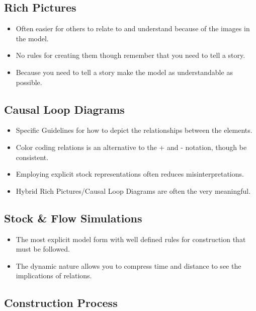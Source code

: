 \documentclass[]{memoir}
\begin{document}
\subsection{Rich Pictures}

\begin{itemize}
\itemsep1pt\parskip0pt
\item
  Often easier for others to relate to and understand because of the
  images in the model.
\item
  No rules for creating them though remember that you need to tell a
  story.
\item
  Because you need to tell a story make the model as understandable as
  possible.
\end{itemize}

\subsection{Causal Loop Diagrams}

\begin{itemize}
\itemsep1pt\parskip0pt
\item
  Specific Guidelines for how to depict the relationships between the
  elements.
\item
  Color coding relations is an alternative to the + and - notation,
  though be consistent.
\item
  Employing explicit stock representations often reduces
  misinterpretations.
\item
  Hybrid Rich Pictures/Causal Loop Diagrams are often the very
  meaningful.
\end{itemize}

\subsection{Stock \& Flow Simulations}

\begin{itemize}
\itemsep1pt\parskip0pt
\item
  The most explicit model form with well defined rules for construction
  that must be followed.
\item
  The dynamic nature allows you to compress time and distance to see the
  implications of relations.
\end{itemize}

\subsection{Construction Process}
\end{document}
